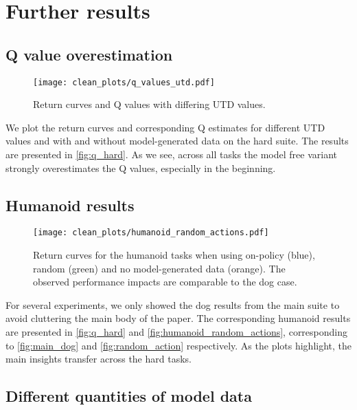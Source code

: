 \newpage

\section{Further results}
\label{app:results}

\subsection{Q value overestimation}
\label{app:results_q}
\begin{figure}[ht]
    \centering
    \texttt{[image: clean\_plots/q\_values\_utd.pdf]}
    \caption{Return curves and Q values with differing UTD values.}
    \label{fig:q_hard}
\end{figure}


We plot the return curves and corresponding Q estimates for different UTD values and with and without model-generated data on the hard suite.
The results are presented in \autoref{fig:q_hard}.
As we see, across all tasks the model free variant strongly overestimates the Q values, especially in the beginning.

\newpage

\subsection{Humanoid results}
\label{app:results_hum}


\begin{figure}[H]
    \centering
    \texttt{[image: clean\_plots/humanoid\_random\_actions.pdf]}
    \caption{Return curves for the humanoid tasks when using on-policy (blue), random (green) and no model-generated data (orange). The observed performance impacts are comparable to the dog case.}
    \label{fig:humanoid_random_actions}
\end{figure}

For several experiments, we only showed the dog results from the main suite to avoid cluttering the main body of the paper.
The corresponding humanoid results are presented in \autoref{fig:q_hard} and \autoref{fig:humanoid_random_actions}, corresponding to \autoref{fig:main_dog} and \autoref{fig:random_action} respectively.
As the plots highlight, the main insights transfer across the hard tasks.

\newpage

\subsection{Different quantities of model data}
\label{app:model_data}

